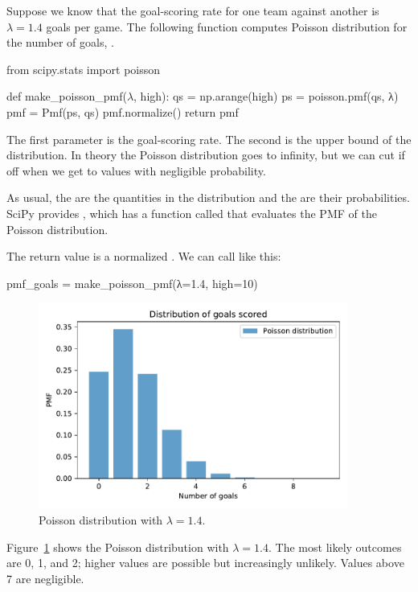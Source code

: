 \documentclass[12pt]{book}
\theoremstyle{exercise}
\begin{document}
\newcommand{\lam}{$\lambda$}

Suppose we know that the goal-scoring rate for one team against another is $\lambda = 1.4$ goals per game.
The following function computes Poisson distribution for the number of goals, .

\begin{code}
from scipy.stats import poisson

def make_poisson_pmf($\lambda$, high):
    qs = np.arange(high)
    ps = poisson.pmf(qs, λ)
    pmf = Pmf(ps, qs)
    pmf.normalize()
    return pmf
\end{code}

The first parameter is the goal-scoring rate.  
The second is the upper bound of the distribution.
In theory the Poisson distribution goes to infinity, but we can cut if off when we get to values with negligible probability.

As usual, the  are the quantities in the distribution and the  are their probabilities.
SciPy provides , which has a function called  that evaluates the PMF of the Poisson distribution.

The return value is a normalized .
We can call  like this:

\begin{code}
pmf_goals = make_poisson_pmf(λ=1.4, high=10)
\end{code}


\begin{figure}
\centerline{\includegraphics[width=4in]{figs/fig07-01.pdf}}
\caption{Poisson distribution with $\lambda=1.4$.}
\label{fig07-01}
\end{figure}

Figure~\ref{fig07-01} shows the Poisson distribution with $\lambda=1.4$.
The most likely outcomes are 0, 1, and 2; higher values are possible but increasingly unlikely.
Values above 7 are negligible.
\end{document}
